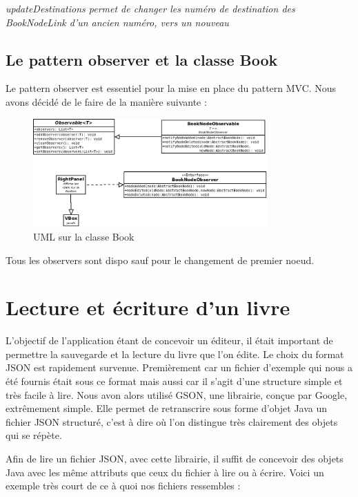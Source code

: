 			\textit{updateDestinations permet de changer les numéro de destination des BookNodeLink d'un ancien numéro, vers un nouveau}

		\subsection{Le pattern observer et la classe Book}
			\label{subsec:pattern_observer}

			Le pattern observer est essentiel pour la mise en place du pattern MVC. Nous avons décidé de le faire de la manière suivante :

			\begin{figure}[H]
				\centering\includegraphics[width=0.8\textwidth, keepaspectratio]{img/observer.png}
				\caption{UML sur la classe Book}
			\end{figure}

			Tous les observers sont dispo sauf pour le changement de premier noeud.

	\section{Lecture et écriture d'un livre}\label{Json}

		L'objectif de l'application étant de concevoir un éditeur, il était important de permettre la sauvegarde et la lecture du livre que l'on édite. Le choix du format JSON est rapidement survenue. Premièrement car un fichier d'exemple qui nous a été fournis était sous ce format mais aussi car il s'agit d'une structure simple et très facile à lire. Nous avon alors utilisé GSON, une librairie, conçue par Google, extrêmement simple. Elle permet de retranscrire sous forme d'objet Java un fichier JSON structuré, c'est à dire où l'on distingue très clairement des objets qui se répète.

		Afin de lire un fichier JSON, avec cette librairie, il suffit de concevoir des objets Java avec les même attributs que ceux du fichier à lire ou à écrire. Voici un exemple très court de ce à quoi nos fichiers ressembles :

